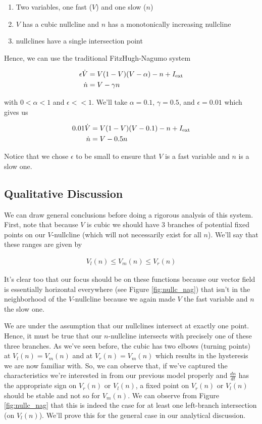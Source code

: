 \documentclass{article}
\begin{document}
\begin{enumerate}
    \item Two variables, one fast ($V$) and one slow ($n$)
    \item $V$ has a cubic nullcline and $n$ has a monotonically increasing nullcline
    \item nullclines have a single intersection point
\end{enumerate}

Hence, we can use the traditional FitzHugh-Nagumo system

\begin{align*}
    \epsilon {\dot  {V} }&= V(1-V)(V-\alpha) -n+I_{{{\rm {ext}}}} \\
     {\dot  {n}}&=V-\gamma n
\end{align*}

with $0<\alpha<1$ and $\epsilon << 1$. We'll take $\alpha = 0.1$, $\gamma = 0.5$, and $\epsilon = 0.01$ which gives us

\begin{align*}
    0.01 {\dot  {V} }&= V(1-V)(V-0.1) -n+I_{{{\rm {ext}}}} \\
     {\dot  {n}}&=V-0.5 n
\end{align*}

Notice that we chose $\epsilon$ to be small to ensure that $V$ is a fast variable and $n$ is a slow one. 

\subsection{Qualitative Discussion}

We can draw general conclusions before doing a rigorous analysis of this system. First, note that because $V$ is cubic we should have 3 branches of potential fixed points on our $V$-nullcline (which will not necessarily exist for all $n$). We'll say that these ranges are given by 

\begin{align*}
    V_l(n) \leq V_m(n) \leq V_r(n)
\end{align*}

It's clear too that our focus should be on these functions because our vector field is essentially horizontal everywhere (see Figure \ref{fig:nullc_nag}) that isn't in the neighborhood of the $V$-nullcline because we again made $V$ the fast variable and $n$ the slow one. 

We are under the assumption that our nullclines intersect at exactly one point. Hence, it must be true that our $n$-nullcline intersects with precisely one of these three branches. As we've seen before, the cubic has two elbows (turning points) at $V_l(n)=V_m(n)$ and at $V_r(n)=V_m(n)$ which results in the hysteresis we are now familiar with. So, we can observe that, if we've captured the characteristics we're interested in from our previous model properly and $\frac{dn}{dt}$ has the appropriate sign on $V_r(n)$ or $V_l(n)$, a fixed point on $V_r(n)$ or $V_l(n)$ should be stable and not so for $V_m(n)$. We can observe from Figure \ref{fig:nullc_nag} that this is indeed the case for at least one left-branch intersection (on $V_l(n)$). We'll prove this for the general case in our analytical discussion. 
\end{document}
